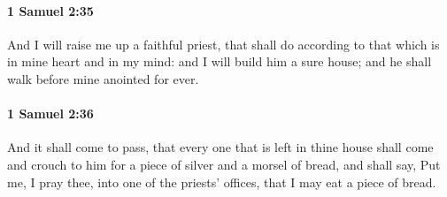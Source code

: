 		\paragraph{1 Samuel 2:35} %
			\label{1SAMUEL-2-35}

			And I will raise me up a faithful priest, that shall do according to that which is in mine heart and in my mind: and I will build him a sure house; and he shall walk before mine anointed for ever.


		\paragraph{1 Samuel 2:36} %
			\label{1SAMUEL-2-36}

			And it shall come to pass, that every one that is left in thine house shall come and crouch to him for a piece of silver and a morsel of bread, and shall say, Put me, I pray thee, into one of the priests’ offices, that I may eat a piece of bread.

